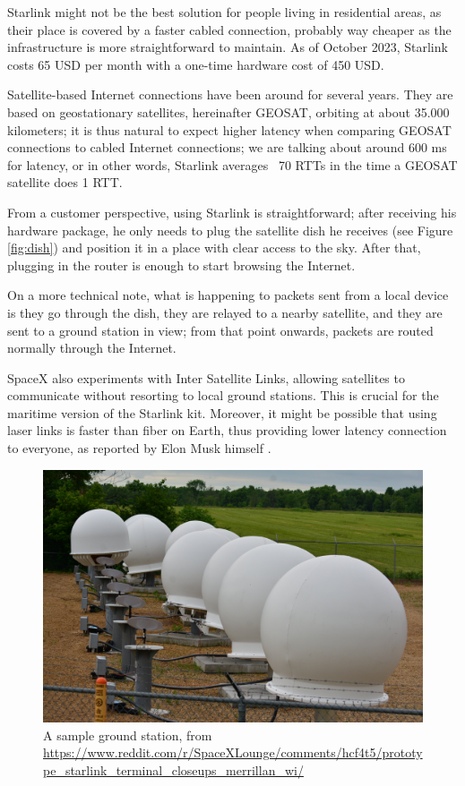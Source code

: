 \documentclass[IN,11pt,twoside,openright,idp,english]{tumthesis}
\begin{document}
Starlink might not be the best solution for people living in residential areas, as their place is covered by a faster cabled connection, probably way cheaper as the infrastructure is more straightforward to maintain. As of October 2023, Starlink costs 65 USD per month with a one-time hardware cost of 450 USD. 

Satellite-based Internet connections have been around for several years. They are based on geostationary satellites, hereinafter GEOSAT, orbiting at about 35.000 kilometers; it is thus natural to expect higher latency when comparing GEOSAT connections to cabled Internet connections; we are talking about around 600 ms for latency, or in other words, Starlink averages ~70 RTTs in the time a GEOSAT satellite does 1 RTT.

From a customer perspective, using Starlink is straightforward; after receiving his hardware package, he only needs to plug the satellite dish he receives (see Figure \ref{fig:dish}) and position it in a place with clear access to the sky. After that, plugging in the router is enough to start browsing the Internet.

On a more technical note, what is happening to packets sent from a local device is they go through the dish, they are relayed to a nearby satellite, and they are sent to a ground station in view; from that point onwards, packets are routed normally through the Internet.

SpaceX also experiments with Inter Satellite Links, allowing satellites to communicate without resorting to local ground stations. This is crucial for the maritime version of the Starlink kit. Moreover, it might be possible that using laser links is faster than fiber on Earth, thus providing lower latency connection to everyone, as reported by Elon Musk himself \cite{tweet}.

\begin{figure}
  \centering
  \includegraphics[width=0.6\columnwidth]{img/ground-station.jpeg}
  \caption{A sample ground station, from \protect\url{https://www.reddit.com/r/SpaceXLounge/comments/hcf4t5/prototype_starlink_terminal_closeups_merrillan_wi/}}
  \label{fig:gs}
\end{figure}
\end{document}
